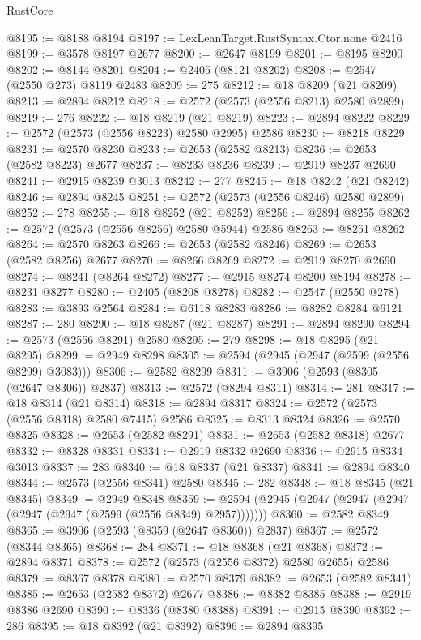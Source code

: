 \begin{lexlean}{RustCore}
\begin{coremodule}
@8195 := @8188 @8194
@8197 := LexLeanTarget.RustSyntax.Ctor.none @2416
@8199 := @3578 @8197 @2677
@8200 := @2647 @8199
@8201 := @8195 @8200
@8202 := @8144 @8201
@8204 := @2405 (@8121 @8202)
@8208 := @2547 (@2550 @273) @8119 @2483
@8209 := 275
@8212 := @18 @8209 (@21 @8209)
@8213 := @2894 @8212
@8218 := @2572 (@2573 (@2556 @8213) @2580 @2899)
@8219 := 276
@8222 := @18 @8219 (@21 @8219)
@8223 := @2894 @8222
@8229 := @2572 (@2573 (@2556 @8223) @2580 @2995) @2586
@8230 := @8218 @8229
@8231 := @2570 @8230
@8233 := @2653 (@2582 @8213)
@8236 := @2653 (@2582 @8223) @2677
@8237 := @8233 @8236
@8239 := @2919 @8237 @2690
@8241 := @2915 @8239 @3013
@8242 := 277
@8245 := @18 @8242 (@21 @8242)
@8246 := @2894 @8245
@8251 := @2572 (@2573 (@2556 @8246) @2580 @2899)
@8252 := 278
@8255 := @18 @8252 (@21 @8252)
@8256 := @2894 @8255
@8262 := @2572 (@2573 (@2556 @8256) @2580 @5944) @2586
@8263 := @8251 @8262
@8264 := @2570 @8263
@8266 := @2653 (@2582 @8246)
@8269 := @2653 (@2582 @8256) @2677
@8270 := @8266 @8269
@8272 := @2919 @8270 @2690
@8274 := @8241 (@8264 @8272)
@8277 := @2915 @8274 @8200 @8194
@8278 := @8231 @8277
@8280 := @2405 (@8208 @8278)
@8282 := @2547 (@2550 @278)
@8283 := @3893 @2564
@8284 := @6118 @8283
@8286 := @8282 @8284 @6121
@8287 := 280
@8290 := @18 @8287 (@21 @8287)
@8291 := @2894 @8290
@8294 := @2573 (@2556 @8291) @2580
@8295 := 279
@8298 := @18 @8295 (@21 @8295)
@8299 := @2949 @8298
@8305 := @2594 (@2945 (@2947 (@2599 (@2556 @8299) @3083)))
@8306 := @2582 @8299
@8311 := @3906 (@2593 (@8305 (@2647 @8306)) @2837)
@8313 := @2572 (@8294 @8311)
@8314 := 281
@8317 := @18 @8314 (@21 @8314)
@8318 := @2894 @8317
@8324 := @2572 (@2573 (@2556 @8318) @2580 @7415) @2586
@8325 := @8313 @8324
@8326 := @2570 @8325
@8328 := @2653 (@2582 @8291)
@8331 := @2653 (@2582 @8318) @2677
@8332 := @8328 @8331
@8334 := @2919 @8332 @2690
@8336 := @2915 @8334 @3013
@8337 := 283
@8340 := @18 @8337 (@21 @8337)
@8341 := @2894 @8340
@8344 := @2573 (@2556 @8341) @2580
@8345 := 282
@8348 := @18 @8345 (@21 @8345)
@8349 := @2949 @8348
@8359 := @2594 (@2945 (@2947 (@2947 (@2947 (@2947 (@2947 (@2599 (@2556 @8349) @2957)))))))
@8360 := @2582 @8349
@8365 := @3906 (@2593 (@8359 (@2647 @8360)) @2837)
@8367 := @2572 (@8344 @8365)
@8368 := 284
@8371 := @18 @8368 (@21 @8368)
@8372 := @2894 @8371
@8378 := @2572 (@2573 (@2556 @8372) @2580 @2655) @2586
@8379 := @8367 @8378
@8380 := @2570 @8379
@8382 := @2653 (@2582 @8341)
@8385 := @2653 (@2582 @8372) @2677
@8386 := @8382 @8385
@8388 := @2919 @8386 @2690
@8390 := @8336 (@8380 @8388)
@8391 := @2915 @8390
@8392 := 286
@8395 := @18 @8392 (@21 @8392)
@8396 := @2894 @8395

\end{coremodule}
\end{lexlean}
